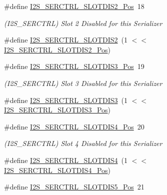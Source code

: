 \begin{DoxyCompactItemize}
\item 
\#define \mbox{\hyperlink{group___s_a_m_d21___i2_s_ga14d31b7d04b4c429b66e7de9299fa993}{I2\+S\+\_\+\+S\+E\+R\+C\+T\+R\+L\+\_\+\+S\+L\+O\+T\+D\+I\+S2\+\_\+\+Pos}}~18
\begin{DoxyCompactList}\small\item\em (I2\+S\+\_\+\+S\+E\+R\+C\+T\+RL) Slot 2 Disabled for this Serializer \end{DoxyCompactList}\item 
\#define \mbox{\hyperlink{group___s_a_m_d21___i2_s_ga3bf99ce15fdb46ad685e4fc9778b15cb}{I2\+S\+\_\+\+S\+E\+R\+C\+T\+R\+L\+\_\+\+S\+L\+O\+T\+D\+I\+S2}}~(1 $<$$<$ \mbox{\hyperlink{group___s_a_m_d21___i2_s_ga14d31b7d04b4c429b66e7de9299fa993}{I2\+S\+\_\+\+S\+E\+R\+C\+T\+R\+L\+\_\+\+S\+L\+O\+T\+D\+I\+S2\+\_\+\+Pos}})
\item 
\#define \mbox{\hyperlink{group___s_a_m_d21___i2_s_gae56e054d8ba40c97a312c36905bc2423}{I2\+S\+\_\+\+S\+E\+R\+C\+T\+R\+L\+\_\+\+S\+L\+O\+T\+D\+I\+S3\+\_\+\+Pos}}~19
\begin{DoxyCompactList}\small\item\em (I2\+S\+\_\+\+S\+E\+R\+C\+T\+RL) Slot 3 Disabled for this Serializer \end{DoxyCompactList}\item 
\#define \mbox{\hyperlink{group___s_a_m_d21___i2_s_gab2fbfb1201dce918e66b96a7c684dc0e}{I2\+S\+\_\+\+S\+E\+R\+C\+T\+R\+L\+\_\+\+S\+L\+O\+T\+D\+I\+S3}}~(1 $<$$<$ \mbox{\hyperlink{group___s_a_m_d21___i2_s_gae56e054d8ba40c97a312c36905bc2423}{I2\+S\+\_\+\+S\+E\+R\+C\+T\+R\+L\+\_\+\+S\+L\+O\+T\+D\+I\+S3\+\_\+\+Pos}})
\item 
\#define \mbox{\hyperlink{group___s_a_m_d21___i2_s_gadc919658ed36400725c6df6f24d1f38b}{I2\+S\+\_\+\+S\+E\+R\+C\+T\+R\+L\+\_\+\+S\+L\+O\+T\+D\+I\+S4\+\_\+\+Pos}}~20
\begin{DoxyCompactList}\small\item\em (I2\+S\+\_\+\+S\+E\+R\+C\+T\+RL) Slot 4 Disabled for this Serializer \end{DoxyCompactList}\item 
\#define \mbox{\hyperlink{group___s_a_m_d21___i2_s_gaa4457af64feb26bb1f5d0d3e5ad8e485}{I2\+S\+\_\+\+S\+E\+R\+C\+T\+R\+L\+\_\+\+S\+L\+O\+T\+D\+I\+S4}}~(1 $<$$<$ \mbox{\hyperlink{group___s_a_m_d21___i2_s_gadc919658ed36400725c6df6f24d1f38b}{I2\+S\+\_\+\+S\+E\+R\+C\+T\+R\+L\+\_\+\+S\+L\+O\+T\+D\+I\+S4\+\_\+\+Pos}})
\item 
\#define \mbox{\hyperlink{group___s_a_m_d21___i2_s_ga67806d2d5411a9d9070dd4df15c48218}{I2\+S\+\_\+\+S\+E\+R\+C\+T\+R\+L\+\_\+\+S\+L\+O\+T\+D\+I\+S5\+\_\+\+Pos}}~21
$$
\end{DoxyCompactItemize}
